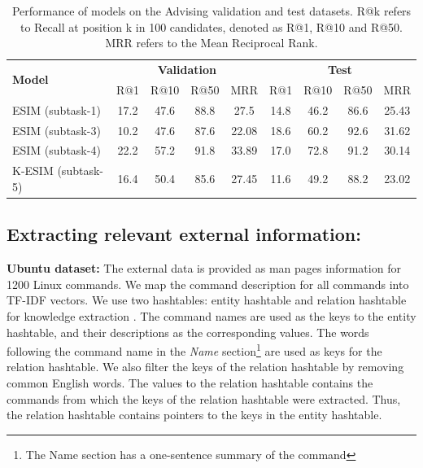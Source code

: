 \documentclass[letterpaper]{article} %
\begin{document}
\begin{table}[h]
\begin{center}
\begin{tabular}{lcccc|cccc}
\hline
\multirow{2}{*}{\textbf{Model}} & \multicolumn{4}{c}{\textbf{Validation}} & \multicolumn{4}{c}{\textbf{Test}}\\
& R@1 & R@10 & R@50 & MRR & R@1 & R@10 & R@50 & MRR  \\ \hline
ESIM (subtask-1) & 17.2 & 47.6 & 88.8 & 27.5 &  14.8 & 46.2 & 86.6 & 25.43 \\ \hline
ESIM (subtask-3) & 10.2 & 47.6 & 87.6 & 22.08 &  18.6 & 60.2 & 92.6 & 31.62 \\ \hline
ESIM (subtask-4) & 22.2 & 57.2 & 91.8 & 33.89 &  17.0 & 72.8 & 91.2 & 30.14 \\ \hline
K-ESIM (subtask-5) & 16.4 & 50.4 & 85.6 & 27.45 &  11.6 & 49.2 & 88.2 & 23.02 \\ \hline
\end{tabular}
\end{center}
\caption{Performance of models on the Advising validation and test datasets. R@k refers to Recall at position k in 100 candidates, denoted as R@1, R@10 and R@50. MRR refers to the Mean Reciprocal Rank.}
\label{tab:baseline-results-advising}
\end{table}


\subsection{Extracting relevant external information:}
\textbf{Ubuntu dataset:} The external data is provided as man pages information for 1200 Linux commands.
We map the command description for all commands into TF-IDF vectors. We use two hashtables: entity hashtable and relation hashtable for knowledge extraction \cite{lowe2015incorporating}. The command names are used as the keys to the entity hashtable, and their descriptions as the corresponding values. The words following the command name in the \textit{Name} section\footnote{The Name section has a one-sentence summary of the command} are used as keys for the relation hashtable. We also filter the keys of the relation hashtable by removing common English words. The values to the relation hashtable contains the commands from which the keys of the relation hashtable were extracted. Thus, the relation hashtable contains pointers to the keys in the entity hashtable.
\end{document}
